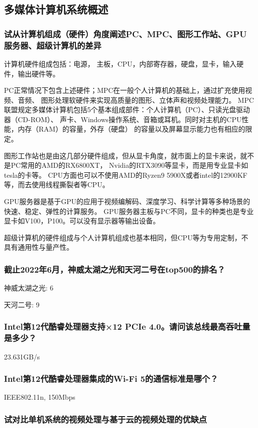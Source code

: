 \documentclass[UTF8,a4paper,AutoFakeBold,AutoFakeSlant]{ctexart}
\begin{document}
\subsection{多媒体计算机系统概述}

\subsubsection{试从计算机组成（硬件）角度阐述PC、MPC、图形工作站、GPU服务器、超级计算机的差异}
计算机硬件组成包括：电源， 主板，CPU，内部寄存器，硬盘，显卡，输入硬件，输出硬件等。

PC正常情况下包含上述硬件；MPC在一般个人计算机的基础上，通过扩充使用视频、音频、
图形处理软硬件来实现高质量的图形、立体声和视频处理能力。
MPC联盟规定多媒体计算机包括5个基本组成部件：个人计算机（PC）、只读光盘驱动器（CD-ROM）、
声卡、Windows操作系统、音箱或耳机。同时对主机的CPU性能，内存（RAM）的容量，外存（硬盘）
的容量以及屏幕显示能力也有相应的限定。

图形工作站也是由这几部分硬件组成，但从显卡角度，就市面上的显卡来说，就不是PC常用的AMD的RX6800XT，
Nvidia的RTX3090等显卡，而是用专业显卡如tesla的卡等。
CPU方面也可以不使用AMD的Ryzen9 5900X或者intel的12900KF等，而去使用线程撕裂者等CPU。

GPU服务器是基于GPU的应用于视频编解码、深度学习、科学计算等多种场景的快速、稳定、弹性的计算服务。
GPU服务器主板与PC不同，显卡的种类也是专业显卡如V100，P100。可以没有显示器等输出设备。

超级计算机的硬件组成与个人计算机组成也基本相同，但CPU等为专用定制，不具有通用性与量产性。


\subsubsection{截止2022年6月，神威太湖之光和天河二号在top500的排名？}
神威太湖之光: 6

天河二号: 9


\subsubsection{Intel第12代酷睿处理器支持×12 PCIe 4.0。请问该总线最高吞吐量是多少？}
23.631GB/s


\subsubsection{Intel第12代酷睿处理器集成的Wi-Fi 5的通信标准是哪个？}
IEEE802.11n, 150Mbps


\subsubsection{试对比单机系统的视频处理与基于云的视频处理的优缺点}
\end{document}
